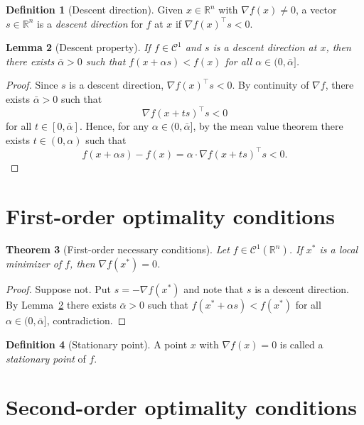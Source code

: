 \documentclass[11pt,a4paper]{report}
\theoremstyle{plain}
\newtheorem{theorem}{Theorem}[chapter]
\newtheorem{lemma}[theorem]{Lemma}
\theoremstyle{definition}
\newtheorem{definition}[theorem]{Definition}
\newcommand{\R}{\mathbb{R}}
\newcommand{\grad}{\nabla}
\newcommand{\trans}{^{\top}}
\begin{document}
\begin{definition}[Descent direction]
Given $x\in\R^{n}$ with $\grad f(x)\ne 0$, a vector $s\in\R^{n}$ is a
\emph{descent direction} for $f$ at $x$ if $\grad f(x)\trans s<0$.
\end{definition}

\begin{lemma}[Descent property]\label{lem:descent}
If $f\in\mathcal{C}^{1}$ and $s$ is a descent direction at $x$, then there
exists $\bar{\alpha}>0$ such that $f(x+\alpha s)<f(x)$ for all
$\alpha\in(0,\bar{\alpha}]$.
\end{lemma}
\begin{proof}
  Since $s$ is a descent direction, $\grad f(x)\trans s<0$. By continuity of
  $\grad f$, there exists $\bar{\alpha}>0$ such that
  \[
    \grad f(x+t s)\trans s<0
  \]
  for all $t\in[0,\bar{\alpha}]$. Hence, for any $\alpha \in (0, \bar{\alpha}]$, by the mean value theorem there exists $t\in(0, \alpha)$ such that
  \[
    f(x+\alpha s)-f(x) = \alpha \cdot \grad f(x+t s)\trans s < 0.
  \]
\end{proof}

\section{First-order optimality conditions}

\begin{theorem}[First-order necessary conditions]\label{thm:foc}
Let $f\in\mathcal{C}^{1}(\R^{n})$. If $x^{*}$ is a local minimizer of $f$,
then $\grad f(x^{*})=0$.
\end{theorem}
\begin{proof}
  Suppose not. Put $s = -\grad f(x^{*})$ and note that $s$ is a descent direction. By Lemma~\ref{lem:descent} there exists $\bar{\alpha}>0$ such that $f(x^{*}+\alpha s)<f(x^{*})$ for all $\alpha \in (0, \bar{\alpha}]$, contradiction.
\end{proof}

\begin{definition}[Stationary point]
A point $x$ with $\grad f(x)=0$ is called a \emph{stationary point} of $f$.
\end{definition}

\section{Second-order optimality conditions}
\end{document}
